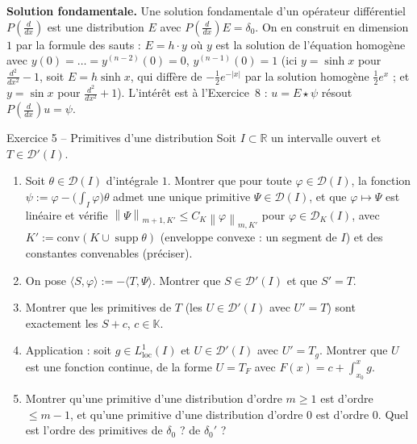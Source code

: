 \documentclass[11pt,a4paper]{article}
\newcommand{\R}{\mathbb{R}}
\newcommand{\K}{\mathbb{K}}
\newcommand{\norm}[1]{\left\|#1\right\|}
\DeclareMathOperator{\supp}{supp}
\newcommand{\D}{\mathcal{D}}
\theoremstyle{definition}
\begin{document}
\begin{pointcle}
\textbf{Solution fondamentale.} Une solution fondamentale d'un opérateur différentiel $P(\frac d{dx})$ est une distribution $E$ avec $P(\frac d{dx})E=\delta_0$. On en construit en dimension $1$ par la formule des sauts : $E=h\cdot y$ où $y$ est la solution de l'équation homogène avec $y(0)=\dots=y^{(n-2)}(0)=0$, $y^{(n-1)}(0)=1$ (ici $y=\sinh x$ pour $\frac{d^2}{dx^2}-1$, soit $E=h\sinh x$, qui diffère de $-\frac12e^{-|x|}$ par la solution homogène $\frac12e^x$ ; et $y=\sin x$ pour $\frac{d^2}{dx^2}+1$). L'intérêt est à l'Exercice~8 : $u=E\star\psi$ résout $P(\frac d{dx})u=\psi$.
\end{pointcle}

\begin{exo}{Exercice 5 -- Primitives d'une distribution}
Soit $I\subset\R$ un intervalle ouvert et $T\in\D'(I)$.
\begin{enumerate}[label=(\alph*)]
  \item Soit $\theta\in\D(I)$ d'intégrale $1$. Montrer que pour toute $\varphi\in\D(I)$, la fonction $\psi:=\varphi-\big(\int_I\varphi\big)\theta$ admet une unique primitive $\Psi\in\D(I)$, et que $\varphi\mapsto\Psi$ est linéaire et vérifie $\norm\Psi_{m+1,K'}\le C_K\norm\varphi_{m,K'}$ pour $\varphi\in\D_K(I)$, avec $K':=\mathrm{conv}(K\cup\supp\theta)$ (enveloppe convexe : un segment de $I$) et des constantes convenables (préciser).
  \item On pose $\langle S,\varphi\rangle:=-\langle T,\Psi\rangle$. Montrer que $S\in\D'(I)$ et que $S'=T$.
  \item Montrer que les primitives de $T$ (les $U\in\D'(I)$ avec $U'=T$) sont exactement les $S+c$, $c\in\K$.
  \item Application : soit $g\in L^1_{\mathrm{loc}}(I)$ et $U\in\D'(I)$ avec $U'=T_g$. Montrer que $U$ est une fonction continue, de la forme $U=T_F$ avec $F(x)=c+\int_{x_0}^xg$.
  \item Montrer qu'une primitive d'une distribution d'ordre $m\ge1$ est d'ordre $\le m-1$, et qu'une primitive d'une distribution d'ordre $0$ est d'ordre $0$. Quel est l'ordre des primitives de $\delta_0$ ? de $\delta_0'$ ?
\end{enumerate}
\end{exo}
\end{document}
